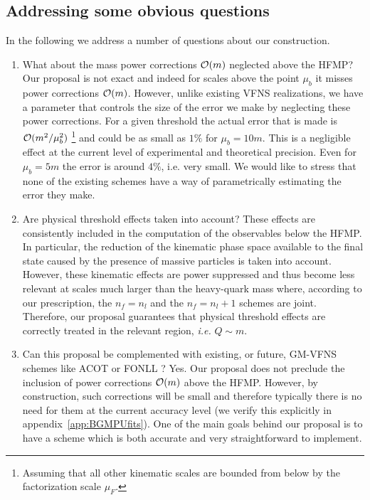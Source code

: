 \documentclass[letter,11pt]{article}
\newcommand{\muF}{\mu_F}
\def\mub{\mu_b}
\begin{document}
\subsection{Addressing some obvious questions}



In the following we address a number of questions about our construction.

%
\begin{enumerate}
%
\item What about the mass power corrections ${\cal O}(m)$ neglected above the HFMP? Our proposal is not exact and indeed for scales above the point $\mub$ it misses power corrections ${\cal O}(m)$. However, unlike existing VFNS realizations, we have a parameter that controls the size of the error we make by neglecting these power corrections. For a given threshold the actual error that is made is ${\cal O}(m^2/\mub^2)$ 
%
\footnote{Assuming that all other kinematic scales are bounded from below by the factorization scale $\muF$.}
%
and could be as small as $1\%$ for $\mub=10 m$. This is a negligible effect at the current level of experimental and theoretical precision. Even for $\mub=5 m$ the error is around $4\%$, i.e. very small. We would like to stress that none of the existing schemes have a way of parametrically estimating the error they make.
%

\item {\color{red} Are physical threshold effects taken into account? These effects are consistently included in the computation of the observables below the HFMP. In particular, the reduction of the kinematic phase space available to the final state caused by the presence of massive particles is taken into account. However, these kinematic effects are power suppressed and thus become less relevant at scales much larger than the heavy-quark mass where, according to our prescription, the $n_f = n_l$ and the $n_f = n_l + 1$ schemes are joint. Therefore, our proposal guarantees that physical threshold effects are correctly treated in the relevant region, \textit{i.e.} $Q \sim m$.}
%
\item Can this proposal be complemented with existing, or future, GM-VFNS schemes like ACOT \cite{Aivazis:1993pi} or FONLL \cite{Forte:2010ta}? Yes. Our proposal does not preclude the inclusion of power corrections ${\cal O}(m)$ above the HFMP. However, by construction, such corrections will be small and therefore typically there is no need for them at the current accuracy level (we verify this explicitly in appendix~\ref{app:BGMPUfits}). One of the main goals behind our proposal is to have a scheme which is both accurate and very straightforward to implement.


\end{enumerate}
\end{document}
